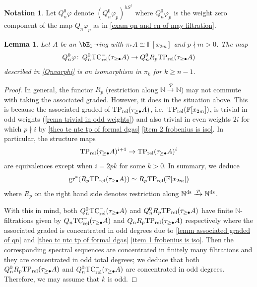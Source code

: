 \documentclass[english,10pt]{amsart}
\newcommand{\rel}{\textup{rel}}
\newcommand{\field}{\mathbb{F}}
\newtheorem{lem}{Lemma}[section]
\theoremstyle{definition}
\newtheorem{nota}{Notation}[section]
\numberwithin{equation}{section}
\newcommand{\rntc}{\mathrm{TC}_{\rel}^{-}}
\newcommand{\rtp}{\mathrm{TP}_{\rel}}
\newcommand{\N}{\mathbb{N}}
\newcommand{\wtw}{\tau_{\geq \bullet}}
\newcommand{\pis}{\pi_*}
\def\co{\colon\thinspace}
\newcommand{\gr}{\textup{gr}^*}
\begin{document}
\begin{nota}\label{Qnvarphi}
Let $Q_n^0\varphi$ denote $(Q_n^0\varphi_p)^{hS^1}$ where $Q_n^0\varphi_p$ is the weight zero component of the map $Q_n\varphi_p$ as in \autoref{exam qn and cn of may filtration}.
\end{nota}
\begin{lem}\label{lemm frobenius is surjective on the quotient}
Let $A$ be an $\bE_1$-ring with $\pis A \cong \field[x_{2m}]$ and $p \nmid m>0$. The map
\begin{equation}\label{map described in notation}
Q_n^0 \varphi \co Q_n^0 \rntc(\tau_{\geq \bullet }A) \to Q_n^0R_p\rtp(\tau_{\geq \bullet }A)
\end{equation}
described in \autoref{Qnvarphi} is an isomorphism in $\pi_k$ for $k\geq n-1$. 
\end{lem}
\begin{proof}


In general, the functor $R_p$ (restriction along $ \N \xrightarrow{\cdot p} \N$) may not commute with taking the associated graded. However, it does in the situation above. This is because the associated graded of $\rtp(\wtw A)$, i.e.\ $\rtp(\field[x_{2m}])$, is trivial in odd weights (\autoref{rema trivial in odd weights}) and also trivial in even weights $2i$ for which $p \nmid i$ by \autoref{theo tc ntc tp of formal dgas} \eqref{item 2 frobenius is iso}. In particular, the structure maps 
\[\rtp(\wtw A)^{i+1} \to \rtp(\wtw A)^i\]
are equivalences except when $i = 2pk$ for some $k>0$. In summary, we deduce
\begin{equation}\label{eq rp commutes with associated graded}
\gr(R_p\rtp(\wtw A)) \simeq R_p\rtp(\field[x_{2m}])\end{equation}
where  $R_p$ on the right hand side denotes restriction along $\N^{\textup{ds}} \xrightarrow{\cdot p} \N^{\textup{ds}}$.

With this in mind, both   $Q_n^0 \rntc(\tau_{\geq \bullet }A)$ and $Q_n^0R_p\rtp(\tau_{\geq \bullet }A)$ have finite $\N$-filtrations given by   $Q_n \rntc(\tau_{\geq \bullet }A)$ and $Q_nR_p\rtp(\tau_{\geq \bullet }A)$ respectively where the associated graded is concentrated in odd degrees due to \autoref{lemm associated graded of qn} and \autoref{theo tc ntc tp of formal dgas} \eqref{item 1 frobenius is iso}. Then the corresponding spectral sequences are concentrated in finitely many filtrations 
and they are concentrated in odd total degrees; we deduce that  both $Q_n^0R_p\rtp(\tau_{\geq \bullet }A)$ and $Q_n^0 \rntc(\tau_{\geq \bullet }A)$ are concentrated in odd degrees. Therefore, we may assume that $k$ is odd. 


\end{proof}
\end{document}
